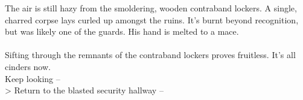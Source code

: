 The air is still hazy from the smoldering, wooden contraband lockers. A single, charred corpse lays curled up amongst the ruins. It's burnt beyond recognition, but was likely one of the guards. His hand is melted to a mace.\\
\\

Sifting through the remnants of the contraband lockers proves fruitless. It's all cinders now.\\

 Keep looking -- \\
> Return to the blasted security hallway -- 